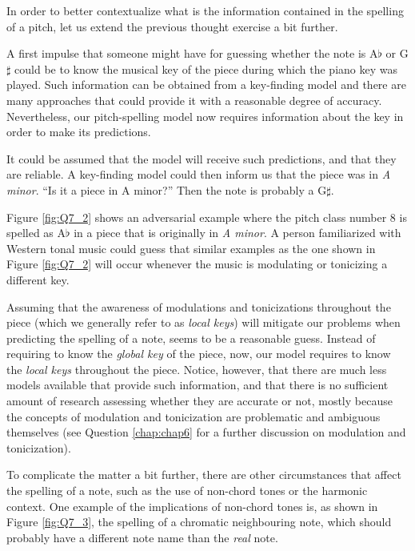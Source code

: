 In order to better contextualize what is the information
contained in the spelling of a pitch, let us extend the
previous thought exercise a bit further.

A first impulse that someone might have for guessing whether
the note is A$\flat$ or G$\sharp$ could be to know the
musical key of the piece during which the piano key was
played. Such information can be obtained from a key-finding
model and there are many approaches that could provide it
with a reasonable degree of accuracy. Nevertheless, our
pitch-spelling model now requires information about the key
in order to make its predictions.

It could be assumed that the model will receive such
predictions, and that they are reliable. A key-finding model
could then inform us that the piece was in \emph{A minor}.
``Is it a piece in A minor?'' Then the note is probably a
G$\sharp$.


Figure \ref{fig:Q7_2} shows an adversarial example where the
pitch class number 8 is spelled as A$\flat$ in a piece that
is originally in \emph{A minor}. A person familiarized with
Western tonal music could guess that similar examples as the
one shown in Figure \ref{fig:Q7_2} will occur whenever the
music is modulating or tonicizing a different key.

Assuming that the awareness of modulations and tonicizations
throughout the piece (which we generally refer to as
\emph{local keys}) will mitigate our problems when
predicting the spelling of a note, seems to be a reasonable
guess. Instead of requiring to know the \emph{global key} of
the piece, now, our model requires to know the \emph{local
keys} throughout the piece. Notice, however, that there are
much less models available that provide such information,
and that there is no sufficient amount of research assessing
whether they are accurate or not, mostly because the
concepts of modulation and tonicization are problematic and
ambiguous themselves (see Question \ref{chap:chap6} for a
further discussion on modulation and tonicization).

To complicate the matter a bit further, there are other
circumstances that affect the spelling of a note, such as
the use of non-chord tones or the harmonic context. One
example of the implications of non-chord tones is, as shown
in Figure \ref{fig:Q7_3}, the spelling of a chromatic
neighbouring note, which should probably have a different
note name than the \emph{real} note.

